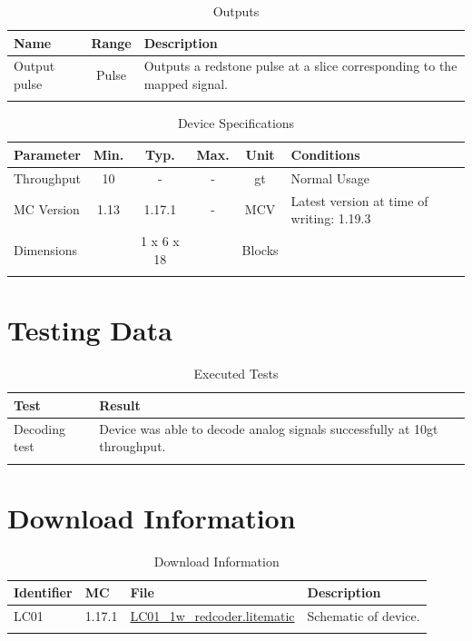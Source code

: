 \documentclass[10pt]{datasheet}
\begin{document}
\begin{table}[h]
    \caption{Outputs}
    \begin{tabularx}{\textwidth}{l | c | X}
        \thickhline
        \textbf{Name} & \textbf{Range} & \textbf{Description} \\
        \hline
        Output pulse & Pulse & Outputs a redstone pulse at a slice corresponding to the mapped signal. \\
        \thickhline
\end{tabularx}
\end{table}

\begin{table}[h]
    \caption{Device Specifications}
    \begin{tabularx}{\textwidth}{l | c c c | c | X}
        \thickhline
        \textbf{Parameter} & \textbf{Min.} & \textbf{Typ.} & \textbf{Max.} &
        \textbf{Unit} & \textbf{Conditions} \\
        \hline
        Throughput  & 10 & - & - & gt & Normal Usage \\
        \hline
        MC Version & 1.13 & 1.17.1 & - & MCV & Latest version at time of writing: 1.19.3\\
        \hline
        Dimensions & & 1 x 6 x 18 & & Blocks & \\
        \thickhline
\end{tabularx}
\end{table}
\newpage
\section{Testing Data}
\begin{table}[h]
\caption{Executed Tests}
\begin{tabularx}{\textwidth}{l | X}
    \thickhline
    \textbf{Test} & \textbf{Result} \\
    \hline
    Decoding test & Device was able to decode analog signals successfully at 10gt throughput. \\
    \thickhline
\end{tabularx}
\end{table}

\section{Download Information}
\begin{table}[h]
    \caption{Download Information}
    \begin{tabularx}{\textwidth}{l | l | l | X}
        \thickhline
        \textbf{Identifier} & \textbf{MC} & \textbf{File} & \textbf{Description} \\
        \hline
        LC01 & 1.17.1 & \href{https://github.com/Soontech-Annals/Archive/blob/8413f90a054b6c415703bae02badeba7541344f6/Archive/logic-and-computation/LC01\%201\%20Wide\%20Redcoder/LC01\_1w\_redcoder.litematic?raw=1}{LC01\_1w\_redcoder.litematic} & Schematic of device. \\
        \hline
        \thickhline
    \end{tabularx}
\end{table}
\end{document}
